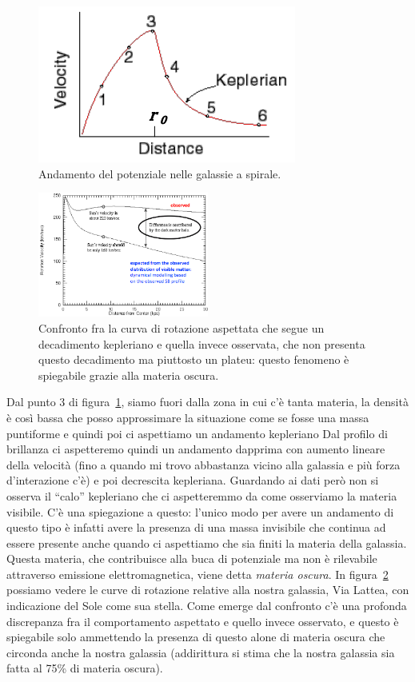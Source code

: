 \begin{figure}
    \centering
    \includegraphics[width = 0.4 \textwidth]{immagini/potenziale-galassie-a-spirale.png}
    \caption{Andamento del potenziale nelle galassie a spirale.}
    \label{fig:potenziale-galassie-a-spirale}
\end{figure}

\begin{figure}
    \centering
    \includegraphics[width= 0.5\textwidth]{immagini/confronto-curve-di-rotazione.png}
    \caption{Confronto fra la curva di rotazione aspettata che segue un decadimento kepleriano e quella invece osservata, che non presenta questo decadimento ma piuttosto un plateu: questo fenomeno è spiegabile grazie alla materia oscura.}
    \label{fig:confronto-curve-di-rotazione}
\end{figure}

Dal punto 3 di figura~\ref{fig:potenziale-galassie-a-spirale}, siamo fuori dalla zona in cui c’è tanta materia, la densità è così bassa che posso approssimare la situazione come se fosse una massa puntiforme e quindi poi ci aspettiamo un andamento kepleriano Dal profilo di brillanza ci aspetteremo quindi un andamento dapprima con aumento lineare della velocità (fino a quando mi trovo abbastanza vicino alla galassia e più forza d'interazione c'è) e poi decrescita kepleriana. Guardando ai dati però non si osserva il “calo” kepleriano che ci aspetteremmo da come osserviamo la materia visibile. C'è una spiegazione a questo: l'unico modo per avere un andamento di questo tipo è infatti avere la presenza di una massa invisibile che continua ad essere presente anche quando ci aspettiamo che sia finiti la materia della galassia. Questa materia, che contribuisce alla buca di potenziale ma non è rilevabile attraverso emissione elettromagnetica, viene detta \emph{materia oscura}. In figura~\ref{fig:confronto-curve-di-rotazione} possiamo vedere le curve di rotazione relative alla nostra galassia, Via Lattea, con indicazione del Sole come sua stella. Come emerge dal confronto c'è una profonda discrepanza fra il comportamento aspettato e quello invece osservato, e questo è spiegabile solo ammettendo la presenza di questo alone di materia oscura che circonda anche la nostra galassia (addirittura si stima che la nostra galassia sia fatta al 75\% di materia oscura).

